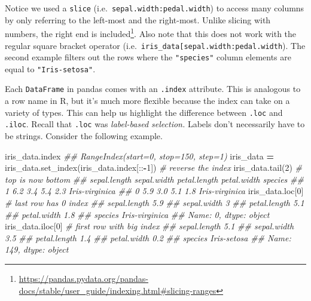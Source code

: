\documentclass[
  12pt,
  krantz2]{krantz}
\makeatletter
\newenvironment{Shaded}{\begin{snugshade}}{\end{snugshade}}
\newcommand{\CommentTok}[1]{\textcolor[rgb]{0.37,0.37,0.37}{\textit{#1}}}
\newcommand{\DecValTok}[1]{\textcolor[rgb]{0.06,0.06,0.06}{#1}}
\newcommand{\NormalTok}[1]{#1}
\newcommand{\OperatorTok}[1]{\textcolor[rgb]{0.43,0.43,0.43}{\textbf{#1}}}
\renewcommand{\href}[2]{#2\footnote{\url{#1}}}
\newenvironment{kframe}{%
\medskip{}
\setlength{\fboxsep}{.8em}
 \def\at@end@of@kframe{}%
 \ifinner\ifhmode%
  \def\at@end@of@kframe{\end{minipage}}%
  \begin{minipage}{\columnwidth}%
 \fi\fi%
 \def\FrameCommand##1{\hskip\@totalleftmargin \hskip-\fboxsep
 \colorbox{shadecolor}{##1}\hskip-\fboxsep
     \hskip-\linewidth \hskip-\@totalleftmargin \hskip\columnwidth}%
 \MakeFramed {\advance\hsize-\width
   \@totalleftmargin\z@ \linewidth\hsize
   \@setminipage}}%
 {\par\unskip\endMakeFramed%
 \at@end@of@kframe}
\renewenvironment{Shaded}{\begin{kframe}}{\end{kframe}}
\makeatother
\begin{document}
Notice we used a \texttt{slice} (i.e.~\texttt{\textquotesingle{}sepal.width\textquotesingle{}:\textquotesingle{}pedal.width\textquotesingle{}}) to access many columns by only referring to the left-most and the right-most. Unlike slicing with numbers, \href{https://pandas.pydata.org/pandas-docs/stable/user_guide/indexing.html\#slicing-ranges}{the right end is included}. Also note that this does not work with the regular square bracket operator (i.e.~\texttt{iris\_data{[}\textquotesingle{}sepal.width\textquotesingle{}:\textquotesingle{}pedal.width\textquotesingle{}{]}}). The second example filters out the rows where the \texttt{"species"} column elements are equal to \texttt{"Iris-setosa"}.

Each \texttt{DataFrame} in pandas comes with an \texttt{.index} attribute. This is analogous to a row name in R, but it's much more flexible because the index can take on a variety of types. This can help us highlight the difference between \texttt{.loc} and \texttt{.iloc}. Recall that \texttt{.loc} was \emph{label-based selection.} Labels don't necessarily have to be strings. Consider the following example.

\begin{Shaded}
\begin{Highlighting}[]
\NormalTok{iris\_data.index}
\CommentTok{\#\# RangeIndex(start=0, stop=150, step=1)}
\NormalTok{iris\_data }\OperatorTok{=}\NormalTok{ iris\_data.set\_index(iris\_data.index[::}\OperatorTok{{-}}\DecValTok{1}\NormalTok{]) }\CommentTok{\# reverse the index}
\NormalTok{iris\_data.tail(}\DecValTok{2}\NormalTok{) }\CommentTok{\# top is now bottom}
\CommentTok{\#\#    sepal.length  sepal.width  petal.length  petal.width         species}
\CommentTok{\#\# 1           6.2          3.4           5.4          2.3  Iris{-}virginica}
\CommentTok{\#\# 0           5.9          3.0           5.1          1.8  Iris{-}virginica}
\NormalTok{iris\_data.loc[}\DecValTok{0}\NormalTok{] }\CommentTok{\# last row has 0 index}
\CommentTok{\#\# sepal.length               5.9}
\CommentTok{\#\# sepal.width                  3}
\CommentTok{\#\# petal.length               5.1}
\CommentTok{\#\# petal.width                1.8}
\CommentTok{\#\# species         Iris{-}virginica}
\CommentTok{\#\# Name: 0, dtype: object}
\NormalTok{iris\_data.iloc[}\DecValTok{0}\NormalTok{] }\CommentTok{\# first row with big index }
\CommentTok{\#\# sepal.length            5.1}
\CommentTok{\#\# sepal.width             3.5}
\CommentTok{\#\# petal.length            1.4}
\CommentTok{\#\# petal.width             0.2}
\CommentTok{\#\# species         Iris{-}setosa}
\CommentTok{\#\# Name: 149, dtype: object}
\end{Highlighting}
\end{Shaded}
\end{document}
